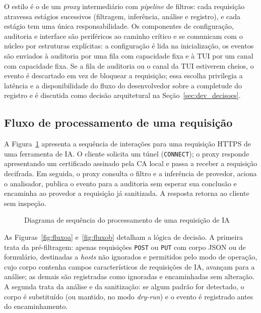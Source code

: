 O estilo é o de um \textit{proxy} intermediário com \textit{pipeline} de filtros: cada requisição atravessa estágios sucessivos (filtragem, inferência, análise e registro), e cada estágio tem uma única responsabilidade. Os componentes de configuração, auditoria e interface são periféricos ao caminho crítico e se comunicam com o núcleo por estruturas explícitas: a configuração é lida na inicialização, os eventos são enviados à auditoria por uma fila com capacidade fixa e à TUI por um canal com capacidade fixa. Se a fila de auditoria ou o canal da TUI estiverem cheios, o evento é descartado em vez de bloquear a requisição; essa escolha privilegia a latência e a disponibilidade do fluxo do desenvolvedor sobre a completude do registro e é discutida como decisão arquitetural na Seção~\ref{sec:dev_decisoes}.

\subsection{Fluxo de processamento de uma requisição}

A Figura~\ref{fig:seq} apresenta a sequência de interações para uma requisição HTTPS de uma ferramenta de IA. O cliente solicita um túnel (\texttt{CONNECT}); o proxy responde apresentando um certificado assinado pela CA local e passa a receber a requisição decifrada. Em seguida, o proxy consulta o filtro e a inferência de provedor, aciona o analisador, publica o evento para a auditoria sem esperar sua conclusão e encaminha ao provedor a requisição já sanitizada. A resposta retorna ao cliente sem inspeção.

\begin{figure}[htb]
\centering
\caption{Diagrama de sequência do processamento de uma requisição de IA}\label{fig:seq}
\end{figure}

As Figuras~\ref{fig:fluxoa} e~\ref{fig:fluxob} detalham a lógica de decisão. A primeira trata da pré-filtragem: apenas requisições \texttt{POST} ou \texttt{PUT} com corpo JSON ou de formulário, destinadas a \textit{hosts} não ignorados e permitidos pelo modo de operação, cujo corpo contenha campos característicos de requisições de IA, avançam para a análise; as demais são registradas como ignoradas e encaminhadas sem alteração. A segunda trata da análise e da sanitização: se algum padrão for detectado, o corpo é substituído (ou mantido, no modo \textit{dry-run}) e o evento é registrado antes do encaminhamento.

